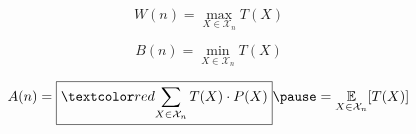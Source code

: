 
\begin{frame}{}
\end{frame}

\begin{frame}{}
  \begin{center}
    {\large {}} \\[8pt] \pause
    {\large {}}
  \end{center}

  \pause
  \[
    W(n) = \max_{X \in \mathcal{X}_{n}} T(X)
  \]

  \pause
  \[
    B(n) = \min_{X \in \mathcal{X}_{n}} T(X)
  \]

  \pause
  \[
    A(n) = \boxed{\red{\sum_{X \in \mathcal{X}_{n}} T(X) \cdot P(X)}} \pause = \underset{X \in \mathcal{X}_{n}}{\mathbb{E}} [T(X)]
  \]
\end{frame}

